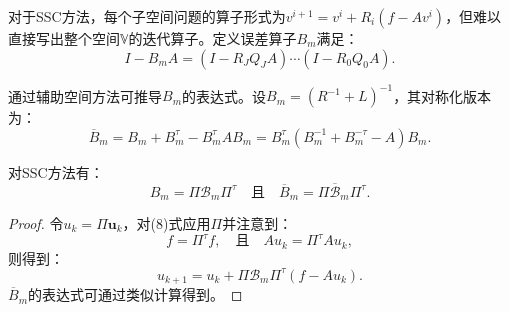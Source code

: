 \documentclass[letterpaper,12pt]{article}
\begin{document}
对于SSC方法，每个子空间问题的算子形式为$v^{i+1} = v^i + R_i(f - Av^i)$，但难以直接写出整个空间$\mathbb{V}$的迭代算子。定义误差算子$B_m$满足：
\[
I - B_m A = (I - R_J Q_J A) \cdots (I - R_0 Q_0 A).
\]

通过辅助空间方法可推导$B_m$的表达式。设$B_m = (R^{-1} + L)^{-1}$，其对称化版本为：
\begin{equation}
\overline{B}_m = B_m + B_m^\tau - B_m^\tau A B_m = B_m^\tau (B_m^{-1} + B_m^{-\tau} - A) B_m.
\end{equation}

\begin{lemma}[3.2]
对SSC方法有：
\[
B_m = \Pi \mathcal{B}_m \Pi^\tau \quad \text{且} \quad \overline{B}_m = \Pi \overline{\mathcal{B}}_m \Pi^\tau.
\]
\end{lemma}
\begin{proof}
令$u_k = \Pi \mathbf{u}_k$，对(8)式应用$\Pi$并注意到：
\[
f = \Pi^\tau f, \quad \text{且} \quad Au_k = \Pi^\tau A u_k,
\]
则得到：
\[
u_{k+1} = u_k + \Pi \mathcal{B}_m \Pi^\tau (f - Au_k).
\]
$\overline{B}_m$的表达式可通过类似计算得到。
\end{proof}
\end{document}
